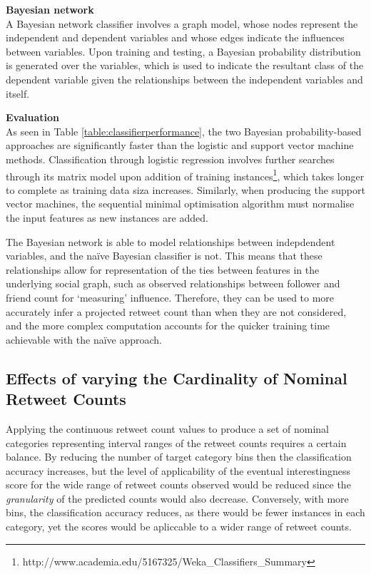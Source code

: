 \textbf{Bayesian network}\\
A Bayesian network classifier involves a graph model, whose nodes represent the independent and dependent variables and whose edges indicate the influences between variables. Upon training and testing, a Bayesian probability distribution is generated over the variables, which is used to indicate the resultant class of the dependent variable given the relationships between the independent variables and itself.

\textbf{Evaluation}\\
As seen in Table \ref{table:classifierperformance}, the two Bayesian probability-based approaches are significantly faster than the logistic and support vector machine methods. Classification through logistic regression involves further searches through its matrix model upon addition of training instances\footnote{http://www.academia.edu/5167325/Weka\_Classifiers\_Summary}, which takes longer to complete as training data siza increases. Similarly, when producing the support vector machines, the sequential minimal optimisation algorithm must normalise the input features as new instances are added.

 The Bayesian network is able to model relationships between indepdendent variables, and the na\"{i}ve Bayesian classifier is not. This means that these relationships allow for representation of the ties between features in the underlying social graph, such as observed relationships between follower and friend count for `measuring' influence. Therefore, they can be used to more accurately infer a projected retweet count than when they are not considered, and the more complex computation accounts for the quicker training time achievable with the na\"{i}ve approach. 


\subsection{Effects of varying the Cardinality of Nominal Retweet Counts}
\label{section:effects_of_varying_bin_sizes}
Applying the continuous retweet count values to produce a set of nominal categories representing interval ranges of the retweet counts requires a certain balance. By reducing the number of target category bins then the classification accuracy increases, but the level of applicability of the eventual interestingness score for the wide range of retweet counts observed would be reduced since the \textit{granularity} of the predicted counts would also decrease. Conversely, with more bins, the classification accuracy reduces, as there would be fewer instances in each category, yet the scores would be apliccable to a wider range of retweet counts.

